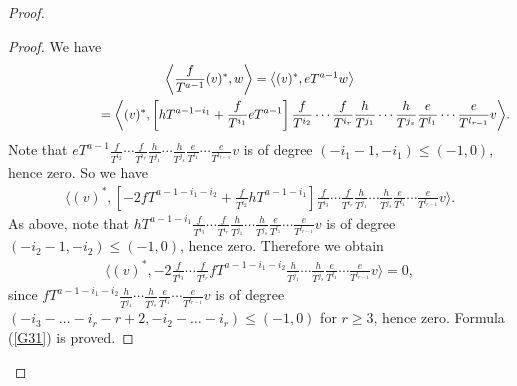 \begin{proof}
\begin{proof}We have
\begin{gather*}
 \bigg\langle \frac{f}{T^{a-1}} (v)^*, w \bigg\rangle = \big\langle (v)^*, eT^{a-1} w \big\rangle \\
\hphantom{\bigg\langle \frac{f}{T^{a-1}} (v)^*, w \bigg\rangle} = \bigg\langle (v)^*, \left[hT^{a-1-i_1} +\frac{f}{T^{i_1}} eT^{a-1}\right]
 \frac{f}{T^{i_2}} \cdots \frac{f}{T^{i_r}} \frac{h}{T^{j_1}}\cdots\frac{h}{T^{j_s}} \frac{e}{T^{l_1}}\cdots\frac{e}{T^{l_{r-1}}} v \bigg\rangle.
\end{gather*}
Note that $eT^{a-1} \frac{f}{T^{i_2}} \cdots \frac{f}{T^{i_r}} \frac{h}{T^{j_1}}\cdots\frac{h}{T^{j_s}} \frac{e}{T^{l_1}}\cdots\frac{e}{T^{l_{r-1}}} v $ is of degree $(-i_1 - 1,-i_1) \leq (-1,0)$, hence zero. So we have
\begin{gather*}
\bigg\langle (v)^*, \left[-2 fT^{a-1-i_1-i_2} +\frac{f}{T^{i_2}} hT^{a-1-i_1} \right]
\frac{f}{T^{i_3}} \cdots \frac{f}{T^{i_r}} \frac{h}{T^{j_1}}\cdots
\frac{h}{T^{j_s}} \frac{e}{T^{l_1}}\cdots\frac{e}{T^{l_{r-1}}} v \bigg\rangle.
\end{gather*}
As above, note that $hT^{a-1-i_1} \frac{f}{T^{i_3}} \cdots \frac{f}{T^{i_r}} \frac{h}{T^{j_1}}\cdots\frac{h}{T^{j_s}} \frac{e}{T^{l_1}}\cdots\frac{e}{T^{l_{r-1}}} v $ is of degree $ (-i_2-1, -i_2) \leq (-1,0)$, hence zero. Therefore we obtain
\begin{gather*}
\bigg\langle (v)^*, -2 \frac{f}{T^{i_3}} \cdots \frac{f}{T^{i_r}} fT^{a-1-i_1-i_2} \frac{h}{T^{j_1}}\cdots\frac{h}{T^{j_s}} \frac{e}{T^{l_1}}\cdots\frac{e}{T^{l_{r-1}}} v \bigg\rangle = 0,
\end{gather*}
since $fT^{a-1-i_1-i_2} \frac{h}{T^{j_1}}\cdots\frac{h}{T^{j_s}} \frac{e}{T^{l_1}}\cdots\frac{e}{T^{l_{r-1}}} v $ is of degree $(-i_3 - \dots - i_r - r + 2, -i_2 - \dots - i_r) \leq (-1,0)$ for $r \geq 3$, hence zero. Formula (\ref{G31}) is proved.


\end{proof}
\end{proof}
